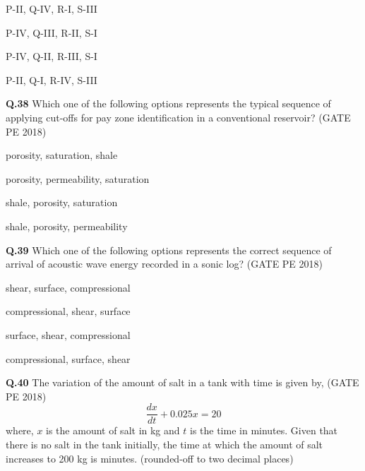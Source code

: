 \documentclass[15pt,a4paper]{article}
\begin{document}
\begin{enumerate} 
\begin{multicols}{2}
\item P-II, Q-IV, R-I, S-III \item P-IV, Q-III, R-II, S-I \\
\item P-IV, Q-II, R-III, S-I \item P-II, Q-I, R-IV, S-III \\
\end{multicols}
\end{enumerate}



\noindent\textbf{Q.38} Which one of the following options represents the typical sequence of applying cut-offs for pay zone identification in a conventional reservoir? \hfill (GATE PE 2018)


\begin{enumerate} 
\begin{multicols}{2}
\item porosity, saturation, shale \item porosity, permeability, saturation \\
\item shale, porosity, saturation \item shale, porosity, permeability \\
\end{multicols}
\end{enumerate}


\noindent\textbf{Q.39} Which one of the following options represents the correct sequence of arrival of acoustic wave energy recorded in a sonic log? \hfill (GATE PE 2018)


\begin{enumerate} 
\begin{multicols}{2}
\item shear, surface, compressional  \item compressional, shear, surface \\ 
\item surface, shear, compressional  \item compressional, surface, shear \\
\end{multicols}
\end{enumerate}



\noindent\textbf{Q.40} The variation of the amount of salt in a tank with time is given by, \hfill (GATE PE 2018)
\[ \frac{dx}{dt} + 0.025x = 20 \]
where, $x$ is the amount of salt in kg and $t$ is the time in minutes. Given that there is no salt in the tank initially, the time at which the amount of salt increases to 200 kg is \underline{\hspace{2cm}} minutes. (rounded-off to two decimal places)
\end{document}
